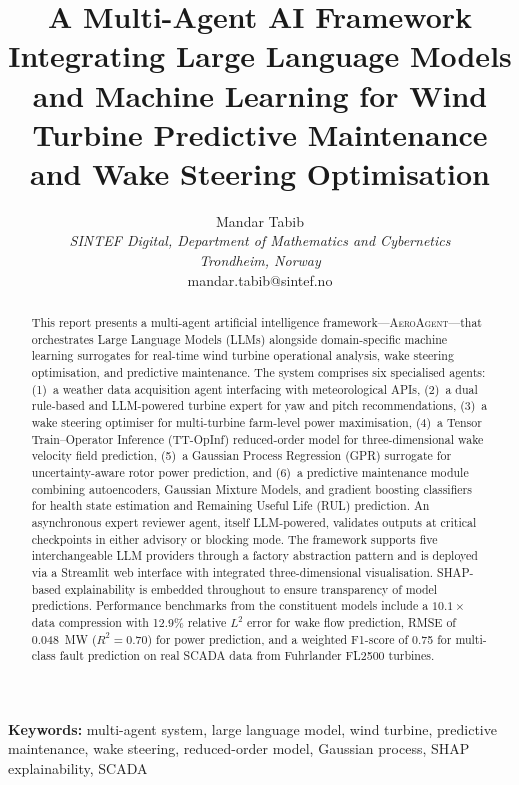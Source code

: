 \documentclass[12pt]{article}
\title{A Multi-Agent AI Framework Integrating Large Language Models and Machine Learning for Wind Turbine Predictive Maintenance and Wake Steering Optimisation}
\author{
  Mandar Tabib \\
  \textit{SINTEF Digital, Department of Mathematics and Cybernetics} \\
  \textit{Trondheim, Norway} \\
  mandar.tabib@sintef.no
}
\date{}
\begin{document}
\maketitle

\begin{abstract}
This report presents a multi-agent artificial intelligence framework---\textsc{AeroAgent}---that orchestrates Large Language Models (LLMs) alongside domain-specific machine learning surrogates for real-time wind turbine operational analysis, wake steering optimisation, and predictive maintenance.
The system comprises six specialised agents: (1)~a weather data acquisition agent interfacing with meteorological APIs, (2)~a dual rule-based and LLM-powered turbine expert for yaw and pitch recommendations, (3)~a wake steering optimiser for multi-turbine farm-level power maximisation, (4)~a Tensor Train--Operator Inference (TT-OpInf) reduced-order model for three-dimensional wake velocity field prediction, (5)~a Gaussian Process Regression (GPR) surrogate for uncertainty-aware rotor power prediction, and (6)~a predictive maintenance module combining autoencoders, Gaussian Mixture Models, and gradient boosting classifiers for health state estimation and Remaining Useful Life (RUL) prediction.
An asynchronous expert reviewer agent, itself LLM-powered, validates outputs at critical checkpoints in either advisory or blocking mode.
The framework supports five interchangeable LLM providers through a factory abstraction pattern and is deployed via a Streamlit web interface with integrated three-dimensional visualisation.
SHAP-based explainability is embedded throughout to ensure transparency of model predictions.
Performance benchmarks from the constituent models include a $10.1\times$ data compression with 12.9\% relative $L^2$ error for wake flow prediction, RMSE of 0.048~MW ($R^2 = 0.70$) for power prediction, and a weighted F1-score of 0.75 for multi-class fault prediction on real SCADA data from Fuhrlander FL2500 turbines.
\end{abstract}

\noindent\textbf{Keywords:} multi-agent system, large language model, wind turbine, predictive maintenance, wake steering, reduced-order model, Gaussian process, SHAP explainability, SCADA

\end{document}
